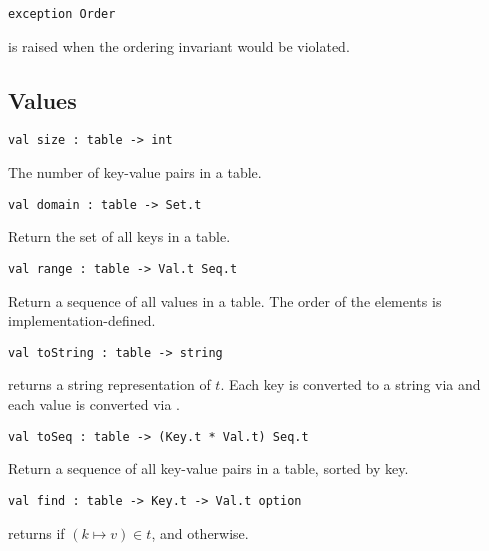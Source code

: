 \begin{gram}
\begin{verbatim}
exception Order
\end{verbatim}
 is raised when the ordering invariant would be violated.
\end{gram}


\subsection{Values}

\begin{gram}[size]
\begin{verbatim}
val size : table -> int
\end{verbatim}
The number of key-value pairs in a table.
\end{gram}

\begin{gram}[domain]
\begin{verbatim}
val domain : table -> Set.t
\end{verbatim}
Return the set of all keys in a table.
\end{gram}

\begin{gram}[range]
\begin{verbatim}
val range : table -> Val.t Seq.t
\end{verbatim}
Return a sequence of all values in a table. The order of the elements is
implementation-defined.
\end{gram}

\begin{gram}[toString]
\begin{verbatim}
val toString : table -> string
\end{verbatim}
 returns a string representation of $t$. Each key is converted
to a string via  and each value is converted via
.
\end{gram}

\begin{gram}[toSeq]
\begin{verbatim}
val toSeq : table -> (Key.t * Val.t) Seq.t
\end{verbatim}
Return a sequence of all key-value pairs in a table, sorted by key.
\end{gram}

\begin{gram}[find]
\begin{verbatim}
val find : table -> Key.t -> Val.t option
\end{verbatim}
 returns  if $(k \mapsto v) \in t$, and 
otherwise.
\end{gram}

